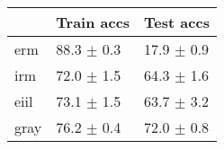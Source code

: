 \begin{tabular}{lll}
\toprule
{} &      Train accs &       Test accs \\
\midrule
erm  &  88.3 $\pm$ 0.3 &  17.9 $\pm$ 0.9 \\
irm  &  72.0 $\pm$ 1.5 &  64.3 $\pm$ 1.6 \\
eiil &  73.1 $\pm$ 1.5 &  63.7 $\pm$ 3.2 \\
gray &  76.2 $\pm$ 0.4 &  72.0 $\pm$ 0.8 \\
\bottomrule
\end{tabular}

